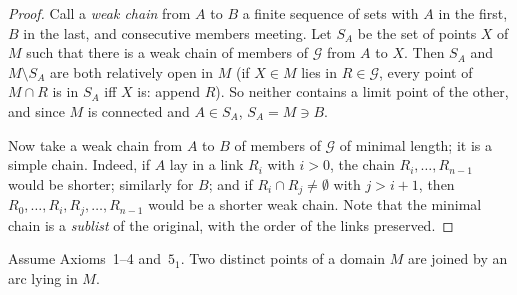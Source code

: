 \begin{proof}
Call a \emph{weak chain} from $A$ to $B$ a finite sequence of sets with $A$ in the first, $B$ in the last,
and consecutive members meeting. Let $S_A$ be the set of points $X$ of $M$ such that there is a weak chain
of members of $\mathcal G$ from $A$ to $X$. Then $S_A$ and $M\setminus S_A$ are both relatively open in $M$
(if $X\in M$ lies in $R\in\mathcal G$, every point of $M\cap R$ is in $S_A$ iff $X$ is: append $R$). So
neither contains a limit point of the other, and since $M$ is connected and $A\in S_A$, $S_A=M\ni B$.

Now take a weak chain from $A$ to $B$ of members of $\mathcal G$ of minimal length; it is a simple chain.
Indeed, if $A$ lay in a link $R_i$ with $i>0$, the chain $R_i,\dots,R_{n-1}$ would be shorter; similarly
for $B$; and if $R_i\cap R_j\ne\emptyset$ with $j>i+1$, then $R_0,\dots,R_i,R_j,\dots,R_{n-1}$ would be a
shorter weak chain. Note that the minimal chain is a \emph{sublist} of the original, with the order of the
links preserved.
\end{proof}


\begin{theorem}[F.A.\ Theorem~15]\label{thm:fa15}
Assume Axioms~1--4 and~$5_1$. Two distinct points of a domain $M$ are joined by an arc lying in $M$.
\end{theorem}

